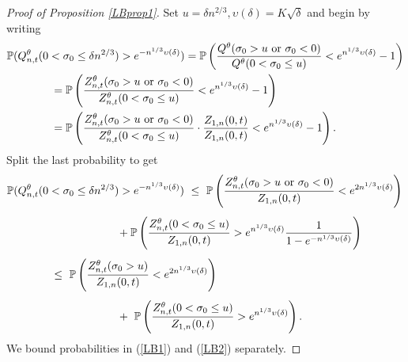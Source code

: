 \documentclass[11pt]{amsart}
\numberwithin{equation}{section}
\theoremstyle{remark}
\begin{document}
\begin{proof}[Proof of Proposition \ref{LBprop1}]
Set $u=\delta n^{2/3}, \upsilon(\delta)=K \sqrt{\delta}$ and begin by writing
\begin{align}
&{\mathbb{P}}(Q^{\theta}_{n,t}(0< \sigma_0\le \delta n^{2/3})>e^{-n^{1/3} \upsilon(\delta)})={\mathbb{P}}\left(\frac{Q^{\theta}( \sigma_0>u\textup{ or } \sigma_0<0)}{Q^{\theta}( 0< \sigma_0 \le u)}<e^{n^{1/3} \upsilon(\delta)}-1\right)\\
&\qquad\qquad 
={\mathbb{P}}\left(\frac{Z^{\theta}_{n,t}( \sigma_0>u \textup{ or } \sigma_0<0)}{Z^{\theta}_{n,t}( 0< \sigma_0 \le u)}<e^{n^{1/3} \upsilon(\delta)}-1\right){\nonumber} \\
&\qquad\qquad 
={\mathbb{P}}\left(\frac{Z^{\theta}_{n,t}( \sigma_0>u\textup{ or } \sigma_0<0)}{Z^{\theta}_{n,t}( 0< \sigma_0 \le u)}\cdot\frac{Z_{1,n}(0,t)}{Z_{1,n}(0,t)}<e^{n^{1/3} \upsilon(\delta)}-1\right){\nonumber} .
\end{align}
Split the last probability to get
\begin{align}
&{\mathbb{P}}(Q^{\theta}_{n,t}(0< \sigma_0\le\delta n^{2/3})>e^{-n^{1/3} \upsilon(\delta)}) 
\ \le \ {\mathbb{P}}\left(\frac{Z^{\theta}_{n,t}( \sigma_0>u\textup{ or } \sigma_0<0)}{Z_{1,n}(0,t)}<e^{2 n^{1/3} \upsilon(\delta)}\right){\nonumber}\\[4pt]
&\qquad\qquad\qquad \qquad\qquad 
 +{\mathbb{P}}\left(\frac{Z^{\theta}_{n,t}( 0< \sigma_0\le u)}{Z_{1,n}(0,t)}> e^{n^{1/3}  \upsilon(\delta)} \frac1{1-e^{-n^{1/3} \upsilon(\delta)}}\right){\nonumber}\\[4pt]
&\qquad\qquad
 \le \ {\mathbb{P}}\left(\frac{Z^{\theta}_{n,t}( \sigma_0>u)}{Z_{1,n}(0,t)}<e^{2 n^{1/3} \upsilon(\delta)}\right)
\label{LB1}\\[4pt]
&\qquad\qquad \qquad \qquad\qquad
+ \ {\mathbb{P}}\left(\frac{Z^{\theta}_{n,t}( 0< \sigma_0\le u)}{Z_{1,n}(0,t)}> e^{n^{1/3}  \upsilon(\delta)}\right). \label{LB2}
\end{align}
We   bound    probabilities in (\ref{LB1}) and (\ref{LB2})  separately.


\end{proof}
\end{document}
